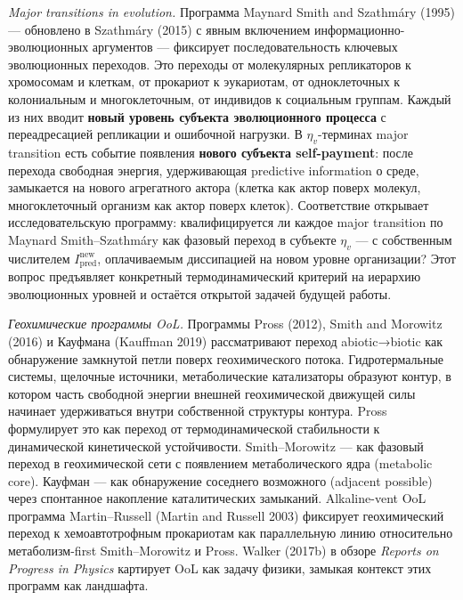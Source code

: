 \documentclass[pdflatex,sn-mathphys-ay]{sn-jnl}
\begin{document}
\emph{Major transitions in evolution.} Программа Maynard Smith and Szathmáry (1995) --- обновлено в Szathmáry (2015) с явным включением информационно-эволюционных аргументов --- фиксирует последовательность ключевых эволюционных переходов. Это переходы от молекулярных репликаторов к хромосомам и клеткам, от прокариот к эукариотам, от одноклеточных к колониальным и многоклеточным, от индивидов к социальным группам. Каждый из них вводит \textbf{новый уровень субъекта эволюционного процесса} с переадресацией репликации и ошибочной нагрузки. В \(\eta_v\)-терминах major transition есть событие появления \textbf{нового субъекта self-payment}: после перехода свободная энергия, удерживающая predictive information о среде, замыкается на нового агрегатного актора (клетка как актор поверх молекул, многоклеточный организм как актор поверх клеток). Соответствие открывает исследовательскую программу: квалифицируется ли каждое major transition по Maynard Smith--Szathmáry как фазовый переход в субъекте \(\eta_v\) --- с собственным числителем \(I_{\text{pred}}^{\text{new}}\), оплачиваемым диссипацией на новом уровне организации? Этот вопрос предъявляет конкретный термодинамический критерий на иерархию эволюционных уровней и остаётся открытой задачей будущей работы.

\emph{Геохимические программы OoL.} Программы Pross (2012), Smith and Morowitz (2016) и Кауфмана (Kauffman 2019) рассматривают переход abiotic→biotic как обнаружение замкнутой петли поверх геохимического потока. Гидротермальные системы, щелочные источники, метаболические катализаторы образуют контур, в котором часть свободной энергии внешней геохимической движущей силы начинает удерживаться внутри собственной структуры контура. Pross формулирует это как переход от термодинамической стабильности к динамической кинетической устойчивости. Smith--Morowitz --- как фазовый переход в геохимической сети с появлением метаболического ядра (metabolic core). Кауфман --- как обнаружение соседнего возможного (adjacent possible) через спонтанное накопление каталитических замыканий. Alkaline-vent OoL программа Martin--Russell (Martin and Russell 2003) фиксирует геохимический переход к хемоавтотрофным прокариотам как параллельную линию относительно метаболизм-first Smith--Morowitz и Pross. Walker (2017b) в обзоре \emph{Reports on Progress in Physics} картирует OoL как задачу физики, замыкая контекст этих программ как ландшафта.
\end{document}
